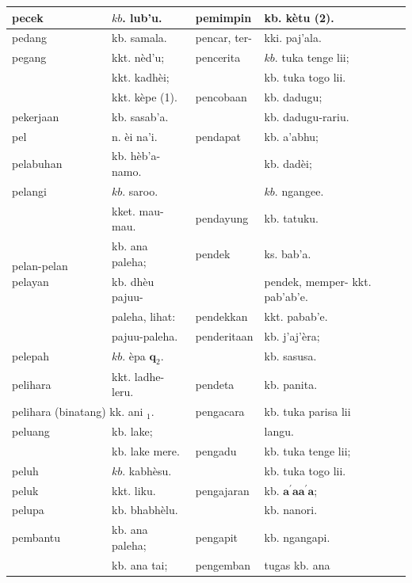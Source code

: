 \documentclass[10pt]{article}
\begin{document}
\begin{center}
\begin{tabular}{|l|l|l|l|}
\hline
pecek & \(k b\). lub'u. & pemimpin & kb. kètu (2). \\
\hline
pedang & kb. samala. & pencar, ter- & kki. paj'ala. \\
\hline
pegang & kkt. nèd'u; & pencerita & \(k b\). tuka tenge lii; \\
\hline
 & kkt. kadhèi; &  & kb. tuka togo lii. \\
\hline
 & kkt. kèpe (1). & pencobaan & kb. dadugu; \\
\hline
pekerjaan & kb. sasab'a. &  & kb. dadugu-rariu. \\
\hline
pel & n. èi na'i. & pendapat & kb. a'abhu; \\
\hline
pelabuhan & kb. hèb'a-namo. &  & kb. dadèi; \\
\hline
pelangi & \(k b\). saroo. &  & \(k b\). ngangee. \\
\hline
\multirow[t]{5}{*}{pelan-pelan pelayan} & kket. mau-mau. & pendayung & kb. tatuku. \\
\hline
 & kb. ana paleha; & pendek & ks. bab'a. \\
\hline
 & kb. dhèu pajuu- &  & pendek, memper- kkt. pab'ab'e. \\
\hline
 & paleha, lihat: & pendekkan & kkt. pabab'e. \\
\hline
 & pajuu-paleha. & penderitaan & kb. j'aj'èra; \\
\hline
pelepah & \(k b\). èpa \(\mathbf{q}_{2}\). &  & kb. sasusa. \\
\hline
pelihara & kkt. ladhe-leru. & pendeta & kb. panita. \\
\hline
\multicolumn{2}{|l|}{pelihara (binatang) kk. ani \({ }_{1}\).} & pengacara & kb. tuka parisa lii \\
\hline
peluang & kb. lake; &  & langu. \\
\hline
 & kb. lake mere. & pengadu & kb. tuka tenge lii; \\
\hline
peluh & \(k b\). kabhèsu. &  & kb. tuka togo lii. \\
\hline
peluk & kkt. liku. & pengajaran & kb. \(\boldsymbol{a}^{\prime} \boldsymbol{a} \boldsymbol{a}^{\prime} \boldsymbol{a}\); \\
\hline
pelupa & kb. bhabhèlu. &  & kb. nanori. \\
\hline
pembantu & kb. ana paleha; & pengapit & kb. ngangapi. \\
\hline
 & kb. ana tai; & pengemban & tugas kb. ana \\

\end{tabular}
\end{center}
\end{document}
